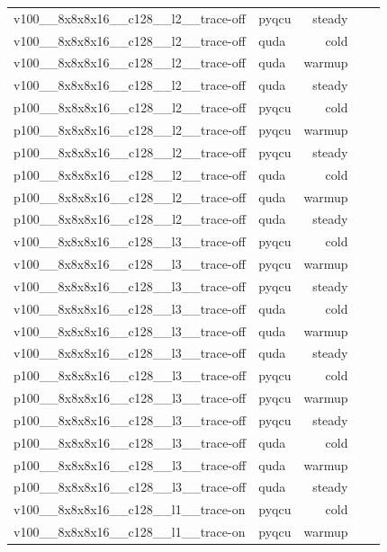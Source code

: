 \begin{table}[htbp]
\begin{tabular}{@{}llrrr@{}}
v100\_\_8x8x8x16\_\_c128\_\_l2\_\_trace-off & pyqcu & steady &  &  \\
v100\_\_8x8x8x16\_\_c128\_\_l2\_\_trace-off & quda & cold &  &  \\
v100\_\_8x8x8x16\_\_c128\_\_l2\_\_trace-off & quda & warmup &  &  \\
v100\_\_8x8x8x16\_\_c128\_\_l2\_\_trace-off & quda & steady &  &  \\
p100\_\_8x8x8x16\_\_c128\_\_l2\_\_trace-off & pyqcu & cold &  &  \\
p100\_\_8x8x8x16\_\_c128\_\_l2\_\_trace-off & pyqcu & warmup &  &  \\
p100\_\_8x8x8x16\_\_c128\_\_l2\_\_trace-off & pyqcu & steady &  &  \\
p100\_\_8x8x8x16\_\_c128\_\_l2\_\_trace-off & quda & cold &  &  \\
p100\_\_8x8x8x16\_\_c128\_\_l2\_\_trace-off & quda & warmup &  &  \\
p100\_\_8x8x8x16\_\_c128\_\_l2\_\_trace-off & quda & steady &  &  \\
v100\_\_8x8x8x16\_\_c128\_\_l3\_\_trace-off & pyqcu & cold &  &  \\
v100\_\_8x8x8x16\_\_c128\_\_l3\_\_trace-off & pyqcu & warmup &  &  \\
v100\_\_8x8x8x16\_\_c128\_\_l3\_\_trace-off & pyqcu & steady &  &  \\
v100\_\_8x8x8x16\_\_c128\_\_l3\_\_trace-off & quda & cold &  &  \\
v100\_\_8x8x8x16\_\_c128\_\_l3\_\_trace-off & quda & warmup &  &  \\
v100\_\_8x8x8x16\_\_c128\_\_l3\_\_trace-off & quda & steady &  &  \\
p100\_\_8x8x8x16\_\_c128\_\_l3\_\_trace-off & pyqcu & cold &  &  \\
p100\_\_8x8x8x16\_\_c128\_\_l3\_\_trace-off & pyqcu & warmup &  &  \\
p100\_\_8x8x8x16\_\_c128\_\_l3\_\_trace-off & pyqcu & steady &  &  \\
p100\_\_8x8x8x16\_\_c128\_\_l3\_\_trace-off & quda & cold &  &  \\
p100\_\_8x8x8x16\_\_c128\_\_l3\_\_trace-off & quda & warmup &  &  \\
p100\_\_8x8x8x16\_\_c128\_\_l3\_\_trace-off & quda & steady &  &  \\
v100\_\_8x8x8x16\_\_c128\_\_l1\_\_trace-on & pyqcu & cold &  &  \\
v100\_\_8x8x8x16\_\_c128\_\_l1\_\_trace-on & pyqcu & warmup &  &  \\

\end{tabular}
\end{table}
